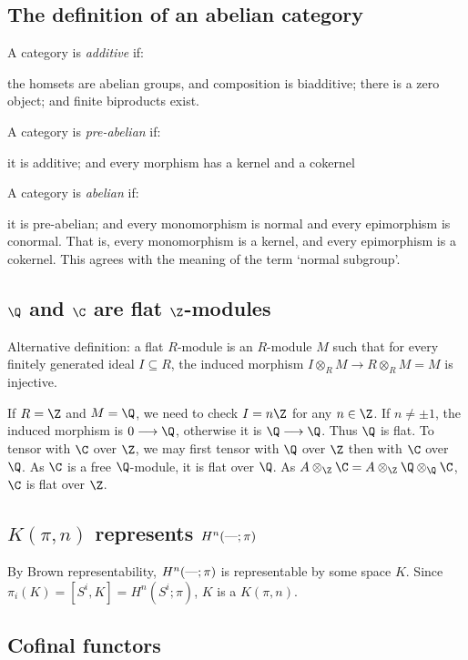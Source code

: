 \documentclass[11pt]{article}
\newcommand{\myheading}[1]
{{\noindent\Large #1}

}
\renewcommand{\myheading}[1]{\subsection{#1}}
\begin{document}
\myheading{The definition of an abelian category}
\begin{abelian categories}
\noindent A category is \emph{additive} if:
\begin{itemise}
\itm the homsets are abelian groups, and composition is biadditive;
\itm there is a zero object; and
\itm finite biproducts exist.
\end{itemise}
A category is \emph{pre-abelian} if:
\begin{itemise}
\itm it is additive; and
\itm every morphism has a kernel and a cokernel
\end{itemise}
A category is \emph{abelian} if:
\begin{itemise}
\itm it is pre-abelian; and
\itm every monomorphism is normal and every epimorphism is conormal. That is,
every monomorphism is a kernel, and every epimorphism is a cokernel. This agrees
with the meaning of the term `normal subgroup'.
\end{itemise}
\end{abelian categories}
\myheading{\texorpdfstring{$\Q$ and $\C$ are flat $\Z$-modules}%
{Q and C are flat Z-modules}}
\begin{Q and C are flat}
Alternative definition: a flat $R$-module is an $R$-module $M$ such that for
every finitely generated ideal $I\subseteq R$, the induced morphism $I\otimes_R
M\to R\otimes_R M=M$ is injective.

If $R=\Z$ and $M=\Q$, we need to check $I=n\Z$ for any $n\in\Z$. If $n\neq\pm1$,
the induced morphism is $0\to\Q$, otherwise it is $\Q\to\Q$. Thus $\Q$ is flat.
To tensor with $\C$ over $\Z$, we may first tensor with $\Q$ over $\Z$ then with
$\C$ over $\Q$. As $\C$ is a free $\Q$-module, it is flat over $\Q$. As 
$A\otimes_{\Z} \C=A\otimes_{\Z}\Q\otimes_{\Q}\C$, $\C$ is flat over $\Z$.

\end{Q and C are flat}
\myheading{\texorpdfstring{$K(\pi,n)$ represents $H^n(\textup{---};\pi)$}%
{Eilenberg-MacLane spaces represent ordinary cohomology}}
\begin{Cohomology is representable}
By Brown representability, $H^n(\textup{---};\pi)$ is representable by some space $K$.
Since $\pi_i(K)=[S^i,K]=H^n(S^i;\pi)$, $K$ is a $K(\pi,n)$.
\end{Cohomology is representable}
\myheading{Cofinal functors}
\end{document}

